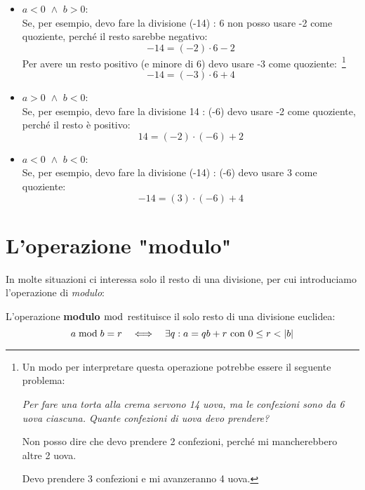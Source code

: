 \begin{itemize}
    \item $a < 0 \,\,\land\,\, b > 0$: \\
    Se, per esempio, devo fare la divisione (-14) : 6 non posso usare -2 come quoziente, perché il resto sarebbe negativo:
    \begin{equation*}
        -14 = (-2) \cdot 6 - 2
    \end{equation*}
    Per avere un resto positivo (e minore di 6) devo usare -3 come quoziente:~\footnote{
    Un modo per interpretare questa operazione potrebbe essere il seguente problema:
    
    \emph{Per fare una torta alla crema servono 14 uova, ma le confezioni sono da 6 uova ciascuna. Quante confezioni di uova devo prendere?} 
    
    Non posso dire che devo prendere 2 confezioni, perché mi mancherebbero altre 2 uova. 
    
    Devo prendere 3 confezioni e mi avanzeranno 4 uova.}
    \begin{equation*}
        -14 = (-3) \cdot 6 + 4
    \end{equation*}

    \item $a > 0 \,\,\land\,\, b < 0$: \\
    Se, per esempio, devo fare la divisione 14 : (-6) devo usare -2 come quoziente, perché il resto è positivo:
    \begin{equation*}
        14 = (-2) \cdot (-6) + 2
    \end{equation*}

    \item $a < 0 \,\,\land\,\, b < 0$: \\
    Se, per esempio, devo fare la divisione (-14) : (-6) devo usare 3 come quoziente:
    \begin{equation*}
        -14 = (3) \cdot (-6) + 4
    \end{equation*}
\end{itemize}

\section{L'operazione "modulo"}
\label{sec:modulo}

In molte situazioni ci interessa solo il resto di una divisione, per cui introduciamo l'operazione di \emph{modulo}:

\begin{definizione}[Modulo]
    L'operazione \textbf{modulo} $\bmod$ restituisce il solo resto di una divisione euclidea:
    \begin{equation*}
        a \bmod b = r  \quad\Longleftrightarrow\quad  \exists q : a = qb + r \text{ con } 0 \le r <  \lvert b \rvert 
    \end{equation*}
\end{definizione}

